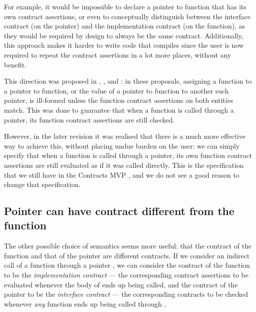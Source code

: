 For example, it would be impossible to declare a pointer to function that has its own contract assertions, or even to conceptually distinguish between the interface contract (on the pointer) and the implementation contract (on the function), as they would be required by design to always be the same contract. Additionally, this approach makes it harder to write code that compiles since the user is now required to repeat the contract assertions in a lot more places, without any benefit.

This direction was proposed in \cite{N4415}, \cite{P0287R0}, and \cite{P0380R0}: in these proposals, assigning a function to a pointer to function, or the value of a pointer to function to another such pointer, is ill-formed unless the function contract assertions on both entities match. This was done to guarantee that when a function is called through a pointer, its function contract assertions are still checked.

However, in the later revision \cite{P0380R1} it was realised that there is a much more effective way to achieve this, without placing undue burden on the user: we can simply specify that when a function is called through a pointer, its own function contract assertions are still evaluated as if it was called directly. This is the specification that we still have in the Contracts MVP \cite{P2900R7}, and we do not see a good reason to change that specification.

\subsection{Pointer can have contract different from the function}

The other possible choice of semantics seems more useful: that the contract of the function and that of the pointer are different contracts. If we consider an indirect call of a function  through a pointer , we can consider the contract of the function  to be the \emph{implementation contract} --- the corresponding contract assertions to be evaluated whenever the body of  ends up being called, and the contract of the pointer  to be the \emph{interface contract} --- the corresponding contracts to be checked whenever \emph{any} function ends up being called through .

